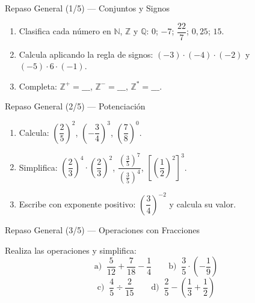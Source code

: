 \documentclass[aspectratio=169]{beamer}
\begin{document}
\begin{frame}{Repaso General \textnormal{(1/5)} — Conjuntos y Signos}
  \begin{mwejercicio}
    \begin{enumerate}
      \item Clasifica cada número en $\mathbb{N}$, $\mathbb{Z}$ y
            $\mathbb{Q}$: $0$;\; $-7$;\; $\dfrac{22}{7}$;\;
            $0{,}25$;\; $15$.
      \item Calcula aplicando la regla de signos:
            $(-3)\cdot(-4)\cdot(-2)$ \; y \;
            $(-5)\cdot 6 \cdot (-1)$.
      \item Completa: $\mathbb{Z}^{+} = \_\_\_$,\;
            $\mathbb{Z}^{-} = \_\_\_$,\; $\mathbb{Z}^{*} = \_\_\_$.
    \end{enumerate}
  \end{mwejercicio}
\end{frame}

\begin{frame}{Repaso General \textnormal{(2/5)} — Potenciación}
  \begin{mwejercicio}
    \begin{enumerate}
      \item Calcula: $\left(\dfrac{2}{5}\right)^{2}$,\;
            $\left(-\dfrac{3}{4}\right)^{3}$,\;
            $\left(\dfrac{7}{8}\right)^{0}$.
      \item Simplifica: $\left(\dfrac{2}{3}\right)^{4} \cdot
            \left(\dfrac{2}{3}\right)^{2}$,\;
            $\dfrac{\left(\frac{3}{5}\right)^{7}}
                   {\left(\frac{3}{5}\right)^{4}}$,\;
            $\left[\left(\dfrac{1}{2}\right)^{2}\right]^{3}$.
      \item Escribe con exponente positivo: $\left(\dfrac{3}{4}\right)^{-2}$
            y calcula su valor.
    \end{enumerate}
  \end{mwejercicio}
\end{frame}

\begin{frame}{Repaso General \textnormal{(3/5)} — Operaciones con Fracciones}
  \begin{mwejercicio}
    Realiza las operaciones y simplifica:
    \[
      \text{a)}\;\; \frac{5}{12} + \frac{7}{18} - \frac{1}{4}
      \qquad
      \text{b)}\;\; \frac{3}{5} \cdot \left(-\frac{1}{9}\right)
    \]
    \[
      \text{c)}\;\; \frac{4}{5} \div \frac{2}{15}
      \qquad
      \text{d)}\;\; \frac{2}{5} - \left(\frac{1}{3} + \frac{1}{2}\right)
    \]
  \end{mwejercicio}
\end{frame}
\end{document}
